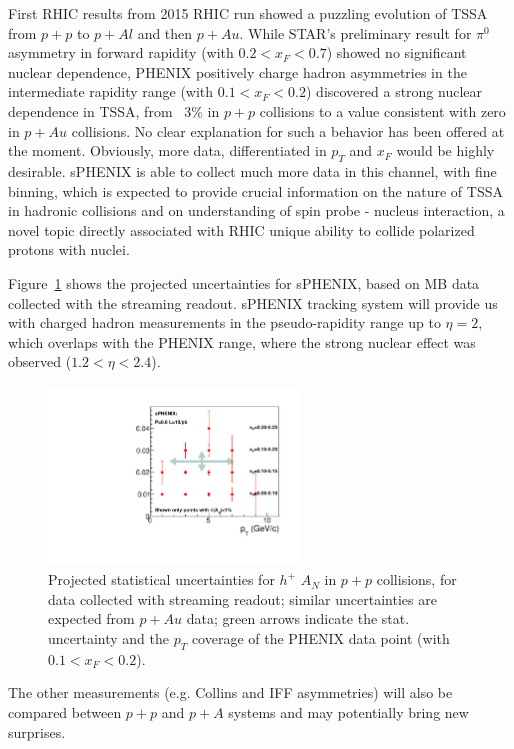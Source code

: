 First RHIC results from 2015 RHIC run showed a puzzling evolution of TSSA from $p+p$ to $p+Al$ and then $p+Au$. While STAR's preliminary result for $\pi^{0}$ asymmetry in forward rapidity (with $0.2<x_F<0.7$) showed no significant nuclear dependence, PHENIX positively charge hadron asymmetries in the intermediate rapidity range (with $0.1<x_F<0.2$) discovered a strong nuclear dependence in TSSA, from ~3\% in $p+p$ collisions to a value consistent with zero in $p+Au$ collisions. No clear explanation for such a behavior has been offered at the moment. Obviously, more data, differentiated in $p_T$ and $x_F$ would be highly desirable. sPHENIX is able to collect much more data in this channel, with fine binning, which is expected to provide crucial information on the nature of TSSA in hadronic collisions and on understanding of spin probe - nucleus interaction, a novel topic directly associated with RHIC unique ability to collide polarized protons with nuclei.

Figure~\ref{fig:AN_h} shows the projected uncertainties for sPHENIX, based on MB data collected with the streaming readout. sPHENIX tracking system will provide us with charged hadron measurements in the pseudo-rapidity range up to $\eta=2$, which overlaps with the PHENIX range, where the strong nuclear effect was observed ($1.2<\eta<2.4$).

\begin{figure}[htbp]
\centering
\includegraphics[width=0.60\textwidth]{figs/sphenix_han.pdf}
\caption{Projected statistical uncertainties for $h^{+}$ $A_N$ in $p+p$ collisions, for data collected with streaming readout; similar uncertainties are expected from $p+Au$ data; green arrows indicate the stat. uncertainty and the $p_T$ coverage of the PHENIX data point (with $0.1<x_F<0.2$).}
\label{fig:AN_h}
\end{figure}

The other measurements (e.g. Collins and IFF asymmetries) will also be compared between $p+p$ and $p+A$ systems and may potentially bring new surprises.



